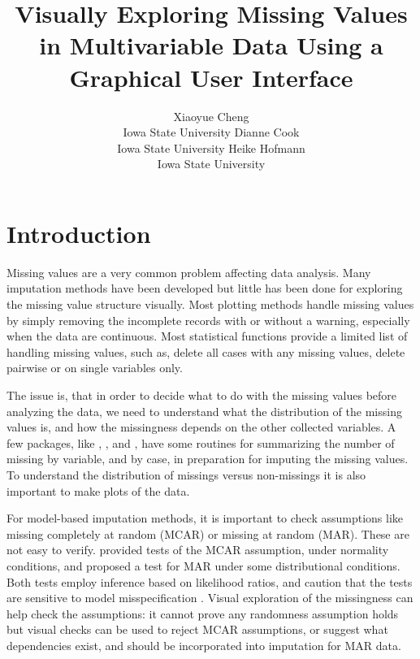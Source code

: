 \documentclass[article]{jss}
\author{Xiaoyue Cheng\\Iowa State University \And 
        Dianne Cook\\Iowa State University \And
        Heike Hofmann\\Iowa State University}
\title{Visually Exploring Missing Values in Multivariable Data 
       Using a Graphical User Interface}
\begin{document}
\section{Introduction}\label{introduction}

Missing values are a very common problem affecting data analysis. Many imputation methods have been developed but little has been done for exploring the missing value structure visually.  Most plotting methods handle missing values by simply removing the incomplete records with or without a warning, especially when the data are continuous. Most statistical functions provide a limited list of handling missing values, such as, delete all cases with any missing values, delete pairwise or on single variables only.

The issue is, that in order to decide what to do with the missing values before analyzing the data, we need to understand what the distribution of the missing values is, and how the missingness depends on the other collected variables. A few  packages, like  \citep{hmisc},  \citep{norm}, and  \citep{mice}, have some routines for summarizing the number of missing by variable, and by case, in preparation for imputing the missing values. To understand the distribution of missings versus non-missings it is also important to make plots of the data.

For model-based imputation methods, it is important to check assumptions like missing completely at random (MCAR) or missing at random (MAR). These are not easy to verify. \citet{little1988test} provided tests of the MCAR assumption, under normality conditions, and \citet{jaeger2006testing} proposed a test for MAR under some distributional conditions. Both tests employ inference based on likelihood ratios, and caution that the tests are sensitive to model misspecification \citep{little1988test}.  Visual exploration of the missingness can help check the assumptions: it cannot prove any randomness assumption holds but visual checks can be used to reject MCAR assumptions, or suggest what dependencies exist, and should be incorporated into imputation for MAR data.
\end{document}
